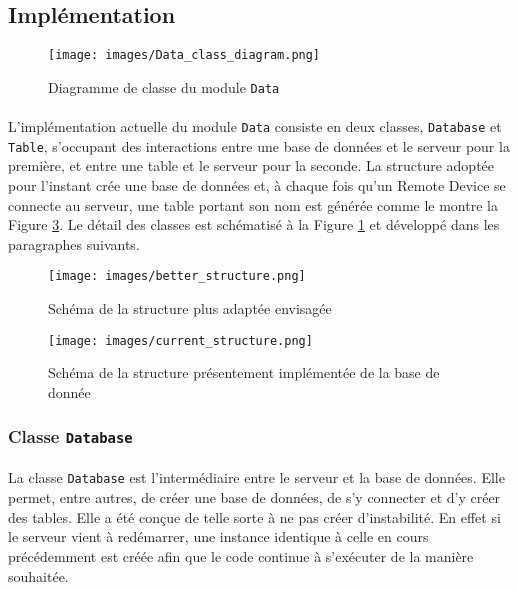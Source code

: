 \documentclass[11pt,a4paper,11pt]{report}
\begin{document}
\subsection{Implémentation}

\begin{figure}
\centering
\texttt{[image: images/Data\_class\_diagram.png]}
\caption{Diagramme de classe du module \texttt{Data}}
\label{Data_class_diagram}
\end{figure}

\paragraph*{}
L'implémentation actuelle du module \texttt{Data} consiste en deux classes, \texttt{Database} et \texttt{Table}, s'occupant des interactions entre une base de données et le serveur pour la première, et entre une table et le serveur pour la seconde. La structure adoptée pour l'instant crée une base de données et, à chaque fois qu'un Remote Device se connecte au serveur, une table portant son nom est générée comme le montre la Figure \ref{current_structure}. Le détail des classes est schématisé à la Figure \ref{Data_class_diagram} et développé dans les paragraphes suivants.
   
\begin{figure}
\centering
\texttt{[image: images/better\_structure.png]}
\caption{Schéma de la structure plus adaptée envisagée}
\label{Better_structure}
\end{figure}

\begin{figure}
\centering
\texttt{[image: images/current\_structure.png]}
\caption{Schéma de la structure présentement implémentée de la base de donnée}
\label{current_structure}
\end{figure}

\subsubsection{Classe \texttt{Database} }
\paragraph*{}
   La classe \texttt{Database} est l'intermédiaire entre le serveur et la base de données. Elle permet, entre autres, de créer une base de données, de s'y connecter et d'y créer des tables. Elle a été conçue de telle sorte à ne pas créer d'instabilité. En effet si le serveur vient à redémarrer, une instance identique à celle en cours précédemment est créée afin que le code continue à s'exécuter de la manière souhaitée.
    
\end{document}
